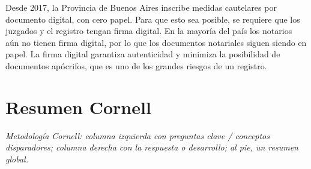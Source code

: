 \documentclass[12pt,oneside]{book}
\begin{document}
Desde 2017, la Provincia de Buenos Aires inscribe medidas cautelares por documento digital, con cero papel. Para que esto sea posible, se requiere que los juzgados y el registro tengan firma digital. En la mayoría del país los notarios aún no tienen firma digital, por lo que los documentos notariales siguen siendo en papel. La firma digital garantiza autenticidad y minimiza la posibilidad de documentos apócrifos, que es uno de los grandes riesgos de un registro.


\chapter{Resumen Cornell}
\label{chap:resumen-cornell}

\textit{Metodología Cornell: columna izquierda con preguntas clave / conceptos disparadores; columna derecha con la respuesta o desarrollo; al pie, un resumen global.}
\end{document}
